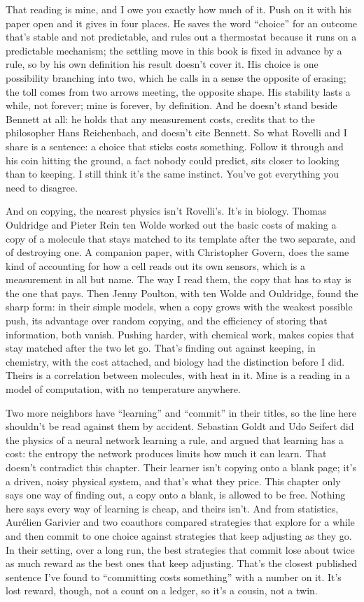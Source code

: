 \documentclass[11pt,twoside]{article}
\theoremstyle{thielethm}
\theoremstyle{thieledef}
\theoremstyle{thieledef}
\theoremstyle{thieledef}
\theoremstyle{thielethm}
\theoremstyle{thieleobs}
\theoremstyle{thielethm}
\begin{document}
That reading is mine, and I owe you exactly how much of it. Push on it with his paper open and it gives in four places. He saves the word ``choice'' for an outcome that's stable and not predictable, and rules out a thermostat because it runs on a predictable mechanism; the settling move in this book is fixed in advance by a rule, so by his own definition his result doesn't cover it. His choice is one possibility branching into two, which he calls in a sense the opposite of erasing; the toll comes from two arrows meeting, the opposite shape. His stability lasts a while, not forever; mine is forever, by definition. And he doesn't stand beside Bennett at all: he holds that any measurement costs, credits that to the philosopher Hans Reichenbach, and doesn't cite Bennett. So what Rovelli and I share is a sentence: a choice that sticks costs something. Follow it through and his coin hitting the ground, a fact nobody could predict, sits closer to looking than to keeping. I still think it's the same instinct. You've got everything you need to disagree.

And on copying, the nearest physics isn't Rovelli's. It's in biology. Thomas Ouldridge and Pieter Rein ten Wolde worked out the basic costs of making a copy of a molecule that stays matched to its template after the two separate, and of destroying one. A companion paper, with Christopher Govern, does the same kind of accounting for how a cell reads out its own sensors, which is a measurement in all but name. The way I read them, the copy that has to stay is the one that pays. Then Jenny Poulton, with ten Wolde and Ouldridge, found the sharp form: in their simple models, when a copy grows with the weakest possible push, its advantage over random copying, and the efficiency of storing that information, both vanish. Pushing harder, with chemical work, makes copies that stay matched after the two let go. That's finding out against keeping, in chemistry, with the cost attached, and biology had the distinction before I did. Theirs is a correlation between molecules, with heat in it. Mine is a reading in a model of computation, with no temperature anywhere.

Two more neighbors have ``learning'' and ``commit'' in their titles, so the line here shouldn't be read against them by accident. Sebastian Goldt and Udo Seifert did the physics of a neural network learning a rule, and argued that learning has a cost: the entropy the network produces limits how much it can learn. That doesn't contradict this chapter. Their learner isn't copying onto a blank page; it's a driven, noisy physical system, and that's what they price. This chapter only says one way of finding out, a copy onto a blank, is allowed to be free. Nothing here says every way of learning is cheap, and theirs isn't. And from statistics, Aurélien Garivier and two coauthors compared strategies that explore for a while and then commit to one choice against strategies that keep adjusting as they go. In their setting, over a long run, the best strategies that commit lose about twice as much reward as the best ones that keep adjusting. That's the closest published sentence I've found to ``committing costs something'' with a number on it. It's lost reward, though, not a count on a ledger, so it's a cousin, not a twin.
\end{document}
